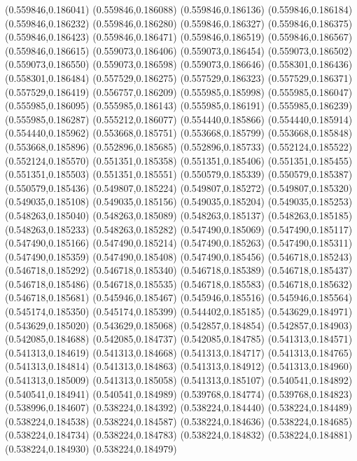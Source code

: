 (0.559846,0.186041)
(0.559846,0.186088)
(0.559846,0.186136)
(0.559846,0.186184)
(0.559846,0.186232)
(0.559846,0.186280)
(0.559846,0.186327)
(0.559846,0.186375)
(0.559846,0.186423)
(0.559846,0.186471)
(0.559846,0.186519)
(0.559846,0.186567)
(0.559846,0.186615)
(0.559073,0.186406)
(0.559073,0.186454)
(0.559073,0.186502)
(0.559073,0.186550)
(0.559073,0.186598)
(0.559073,0.186646)
(0.558301,0.186436)
(0.558301,0.186484)
(0.557529,0.186275)
(0.557529,0.186323)
(0.557529,0.186371)
(0.557529,0.186419)
(0.556757,0.186209)
(0.555985,0.185998)
(0.555985,0.186047)
(0.555985,0.186095)
(0.555985,0.186143)
(0.555985,0.186191)
(0.555985,0.186239)
(0.555985,0.186287)
(0.555212,0.186077)
(0.554440,0.185866)
(0.554440,0.185914)
(0.554440,0.185962)
(0.553668,0.185751)
(0.553668,0.185799)
(0.553668,0.185848)
(0.553668,0.185896)
(0.552896,0.185685)
(0.552896,0.185733)
(0.552124,0.185522)
(0.552124,0.185570)
(0.551351,0.185358)
(0.551351,0.185406)
(0.551351,0.185455)
(0.551351,0.185503)
(0.551351,0.185551)
(0.550579,0.185339)
(0.550579,0.185387)
(0.550579,0.185436)
(0.549807,0.185224)
(0.549807,0.185272)
(0.549807,0.185320)
(0.549035,0.185108)
(0.549035,0.185156)
(0.549035,0.185204)
(0.549035,0.185253)
(0.548263,0.185040)
(0.548263,0.185089)
(0.548263,0.185137)
(0.548263,0.185185)
(0.548263,0.185233)
(0.548263,0.185282)
(0.547490,0.185069)
(0.547490,0.185117)
(0.547490,0.185166)
(0.547490,0.185214)
(0.547490,0.185263)
(0.547490,0.185311)
(0.547490,0.185359)
(0.547490,0.185408)
(0.547490,0.185456)
(0.546718,0.185243)
(0.546718,0.185292)
(0.546718,0.185340)
(0.546718,0.185389)
(0.546718,0.185437)
(0.546718,0.185486)
(0.546718,0.185535)
(0.546718,0.185583)
(0.546718,0.185632)
(0.546718,0.185681)
(0.545946,0.185467)
(0.545946,0.185516)
(0.545946,0.185564)
(0.545174,0.185350)
(0.545174,0.185399)
(0.544402,0.185185)
(0.543629,0.184971)
(0.543629,0.185020)
(0.543629,0.185068)
(0.542857,0.184854)
(0.542857,0.184903)
(0.542085,0.184688)
(0.542085,0.184737)
(0.542085,0.184785)
(0.541313,0.184571)
(0.541313,0.184619)
(0.541313,0.184668)
(0.541313,0.184717)
(0.541313,0.184765)
(0.541313,0.184814)
(0.541313,0.184863)
(0.541313,0.184912)
(0.541313,0.184960)
(0.541313,0.185009)
(0.541313,0.185058)
(0.541313,0.185107)
(0.540541,0.184892)
(0.540541,0.184941)
(0.540541,0.184989)
(0.539768,0.184774)
(0.539768,0.184823)
(0.538996,0.184607)
(0.538224,0.184392)
(0.538224,0.184440)
(0.538224,0.184489)
(0.538224,0.184538)
(0.538224,0.184587)
(0.538224,0.184636)
(0.538224,0.184685)
(0.538224,0.184734)
(0.538224,0.184783)
(0.538224,0.184832)
(0.538224,0.184881)
(0.538224,0.184930)
(0.538224,0.184979)
